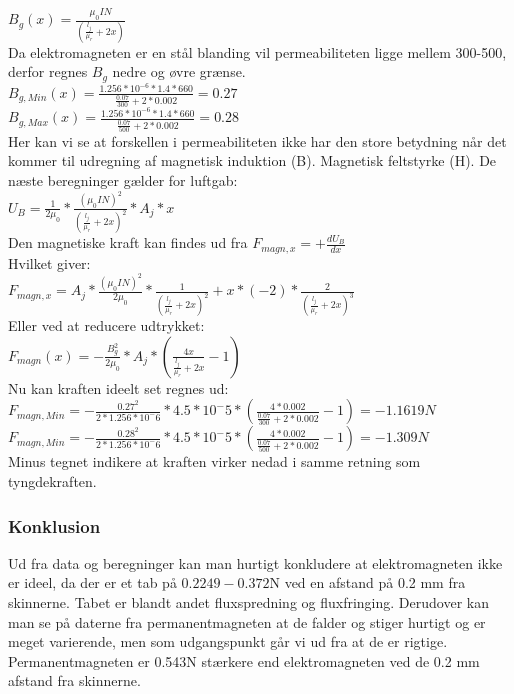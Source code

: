 $B_{g}(x)=\frac{\mu_{0}IN}{({\frac{l_{j}}{\mu_{r}}}+2x)}$\\

Da elektromagneten er en stål blanding vil permeabiliteten ligge mellem 300-500, derfor regnes $B_{g}$ nedre og øvre grænse.\\

$B_{g,Min}(x)=\frac{1.256*10^{-6}*1.4*660}{\frac{0.07}{300}+2*0.002}=0.27$\\

$B_{g,Max}(x)=\frac{1.256*10^{-6}*1.4*660}{\frac{0.07}{500}+2*0.002}=0.28$\\

Her kan vi se at forskellen i permeabiliteten ikke har den store betydning når det kommer til udregning af magnetisk induktion (B). Magnetisk feltstyrke (H). 
De næste beregninger gælder for luftgab:\\

$U_{B}=\frac{1}{2\mu_{0}}*\frac{(\mu_{0}IN)^{2}}{({\frac{l_{j}}{\mu_{r}}}+2x)^{2}}*A_{j}*x$ \\

Den magnetiske kraft kan findes ud fra $F_{magn,x}=+\frac{dU_{B}}{dx}$ \\
Hvilket giver:\\
$F_{magn,x}=A_{j}*\frac{(\mu_{0}IN)^{2}}{2\mu_{0}}*\frac{1}{(\frac{l_{j}}{\mu_{r}}+2x)^{2}}+x*(-2)*\frac{2}{(\frac{l_{j}}{\mu_{r}}+2x)^{3}}$\\

Eller ved at reducere udtrykket:\\
$F_{magn}(x)=-{\frac{B^{2}_{g}}{2\mu_{0}}}* {A_{j}}* (\frac{4x}{{\frac{l_{j}}{\mu_{r}}}+2x}-1) $\\

Nu kan kraften ideelt set regnes ud:\\
$ F_{magn,Min}=-\frac{0.27^{2}}{2*1.256*10^-6}*4.5*10^-5*(\frac{4*0.002}{\frac{0.07}{300}+2*0.002}-1)=-1.1619N $\\

$ F_{magn,Min}=-\frac{0.28^{2}}{2*1.256*10^-6}*4.5*10^-5*(\frac{4*0.002}{\frac{0.07}{500}+2*0.002}-1)=-1.309N $\\

Minus tegnet indikere at kraften virker nedad i samme retning som tyngdekraften.\\

\subsubsection*{Konklusion}
Ud fra data og beregninger kan man hurtigt konkludere at elektromagneten ikke er ideel, da der er et tab på $0.2249-0.372$N ved en afstand på 0.2 mm fra skinnerne. Tabet er blandt andet fluxspredning og fluxfringing. Derudover kan man se på daterne fra permanentmagneten at de falder og stiger hurtigt og er meget varierende, men som udgangspunkt går vi ud fra at de er rigtige. Permanentmagneten er 0.543N stærkere end elektromagneten ved de 0.2 mm afstand fra skinnerne.  


